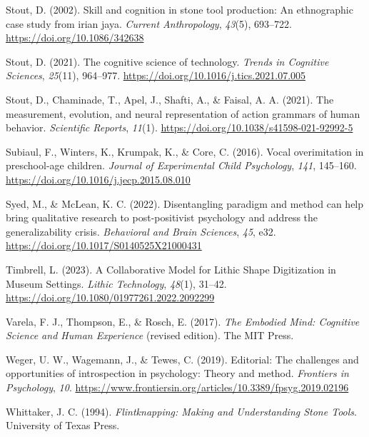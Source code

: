 \documentclass[
  11pt,
  letterpaper,
  DIV=11,
  numbers=noendperiod]{scrartcl}
\newlength{\cslhangindent}
\newenvironment{CSLReferences}[2] %
 {\begin{list}{}{%
  \setlength{\itemindent}{0pt}
  \setlength{\leftmargin}{0pt}
  \setlength{\parsep}{0pt}
  \ifodd #1
   \setlength{\leftmargin}{\cslhangindent}
   \setlength{\itemindent}{-1\cslhangindent}
  \fi
  \setlength{\itemsep}{#2\baselineskip}}}
 {\end{list}}
\begin{document}
\begin{CSLReferences}{1}{0}
Stout, D. (2002). Skill and cognition in stone tool production: An
ethnographic case study from irian jaya. \emph{Current Anthropology},
\emph{43}(5), 693--722. \url{https://doi.org/10.1086/342638}

Stout, D. (2021). The cognitive science of technology. \emph{Trends in
Cognitive Sciences}, \emph{25}(11), 964--977.
\url{https://doi.org/10.1016/j.tics.2021.07.005}

Stout, D., Chaminade, T., Apel, J., Shafti, A., \& Faisal, A. A. (2021).
The measurement, evolution, and neural representation of action grammars
of human behavior. \emph{Scientific Reports}, \emph{11}(1).
\url{https://doi.org/10.1038/s41598-021-92992-5}

Subiaul, F., Winters, K., Krumpak, K., \& Core, C. (2016). Vocal
overimitation in preschool-age children. \emph{Journal of Experimental
Child Psychology}, \emph{141}, 145--160.
\url{https://doi.org/10.1016/j.jecp.2015.08.010}

Syed, M., \& McLean, K. C. (2022). Disentangling paradigm and method can
help bring qualitative research to post-positivist psychology and
address the generalizability crisis. \emph{Behavioral and Brain
Sciences}, \emph{45}, e32.
\url{https://doi.org/10.1017/S0140525X21000431}

Timbrell, L. (2023). A {Collaborative} {Model} for {Lithic} {Shape}
{Digitization} in {Museum} {Settings}. \emph{Lithic Technology},
\emph{48}(1), 31--42.
\url{https://doi.org/10.1080/01977261.2022.2092299}

Varela, F. J., Thompson, E., \& Rosch, E. (2017). \emph{The {Embodied}
{Mind}: {Cognitive} {Science} and {Human} {Experience}} (revised
edition). The MIT Press.

Weger, U. W., Wagemann, J., \& Tewes, C. (2019). Editorial: The
challenges and opportunities of introspection in psychology: Theory and
method. \emph{Frontiers in Psychology}, \emph{10}.
\url{https://www.frontiersin.org/articles/10.3389/fpsyg.2019.02196}

Whittaker, J. C. (1994). \emph{Flintknapping: Making and Understanding
Stone Tools}. University of Texas Press.


\end{CSLReferences}
\end{document}
